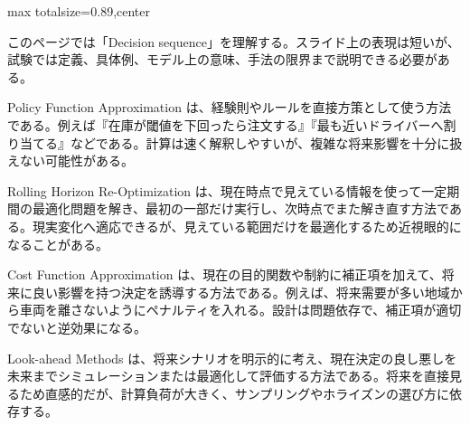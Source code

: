 \begin{minipage}[t]{0.58\textwidth}
\begin{adjustbox}{max totalsize={\textwidth}{0.89\textheight},center}
\begin{minipage}{\textwidth}\scriptsize
{}このページでは「Decision sequence」を理解する。スライド上の表現は短いが、試験では定義、具体例、モデル上の意味、手法の限界まで説明できる必要がある。\par
Policy Function Approximation は、経験則やルールを直接方策として使う方法である。例えば『在庫が閾値を下回ったら注文する』『最も近いドライバーへ割り当てる』などである。計算は速く解釈しやすいが、複雑な将来影響を十分に扱えない可能性がある。\par
Rolling Horizon Re-Optimization は、現在時点で見えている情報を使って一定期間の最適化問題を解き、最初の一部だけ実行し、次時点でまた解き直す方法である。現実変化へ適応できるが、見えている範囲だけを最適化するため近視眼的になることがある。\par
Cost Function Approximation は、現在の目的関数や制約に補正項を加えて、将来に良い影響を持つ決定を誘導する方法である。例えば、将来需要が多い地域から車両を離さないようにペナルティを入れる。設計は問題依存で、補正項が適切でないと逆効果になる。\par
Look-ahead Methods は、将来シナリオを明示的に考え、現在決定の良し悪しを未来までシミュレーションまたは最適化して評価する方法である。将来を直接見るため直感的だが、計算負荷が大きく、サンプリングやホライズンの選び方に依存する。\par

\end{minipage}
\end{adjustbox}
\end{minipage}
